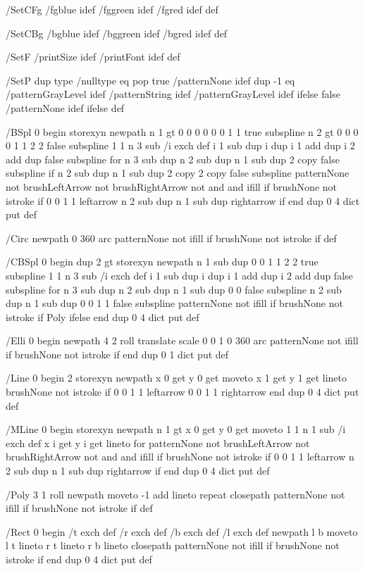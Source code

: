 /SetCFg {
/fgblue idef
/fggreen idef
/fgred idef
} def

/SetCBg {
/bgblue idef
/bggreen idef
/bgred idef
} def

/SetF {
/printSize idef
/printFont idef
} def

/SetP {
dup type /nulltype eq {
pop true /patternNone idef
} {
dup -1 eq {
/patternGrayLevel idef
/patternString idef
} {
/patternGrayLevel idef
} ifelse
false /patternNone idef
} ifelse
} def

/BSpl {
0 begin
storexyn
newpath
n 1 gt {
0 0 0 0 0 0 1 1 true subspline
n 2 gt {
0 0 0 0 1 1 2 2 false subspline
1 1 n 3 sub {
/i exch def
i 1 sub dup i dup i 1 add dup i 2 add dup false subspline
} for
n 3 sub dup n 2 sub dup n 1 sub dup 2 copy false subspline
} if
n 2 sub dup n 1 sub dup 2 copy 2 copy false subspline
patternNone not brushLeftArrow not brushRightArrow not and and { ifill } if
brushNone not { istroke } if
0 0 1 1 leftarrow
n 2 sub dup n 1 sub dup rightarrow
} if
end
} dup 0 4 dict put def

/Circ {
newpath
0 360 arc
patternNone not { ifill } if
brushNone not { istroke } if
} def

/CBSpl {
0 begin
dup 2 gt {
storexyn
newpath
n 1 sub dup 0 0 1 1 2 2 true subspline
1 1 n 3 sub {
/i exch def
i 1 sub dup i dup i 1 add dup i 2 add dup false subspline
} for
n 3 sub dup n 2 sub dup n 1 sub dup 0 0 false subspline
n 2 sub dup n 1 sub dup 0 0 1 1 false subspline
patternNone not { ifill } if
brushNone not { istroke } if
} {
Poly
} ifelse
end
} dup 0 4 dict put def

/Elli {
0 begin
newpath
4 2 roll
translate
scale
0 0 1 0 360 arc
patternNone not { ifill } if
brushNone not { istroke } if
end
} dup 0 1 dict put def

/Line {
0 begin
2 storexyn
newpath
x 0 get y 0 get moveto
x 1 get y 1 get lineto
brushNone not { istroke } if
0 0 1 1 leftarrow
0 0 1 1 rightarrow
end
} dup 0 4 dict put def

/MLine {
0 begin
storexyn
newpath
n 1 gt {
x 0 get y 0 get moveto
1 1 n 1 sub {
/i exch def
x i get y i get lineto
} for
patternNone not brushLeftArrow not brushRightArrow not and and { ifill } if
brushNone not { istroke } if
0 0 1 1 leftarrow
n 2 sub dup n 1 sub dup rightarrow
} if
end
} dup 0 4 dict put def

/Poly {
3 1 roll
newpath
moveto
-1 add
{ lineto } repeat
closepath
patternNone not { ifill } if
brushNone not { istroke } if
} def

/Rect {
0 begin
/t exch def
/r exch def
/b exch def
/l exch def
newpath
l b moveto
l t lineto
r t lineto
r b lineto
closepath
patternNone not { ifill } if
brushNone not { istroke } if
end
} dup 0 4 dict put def

